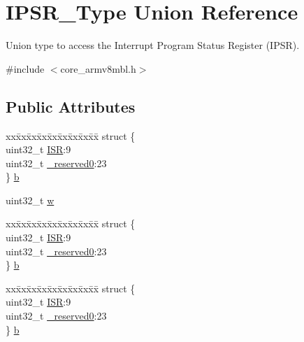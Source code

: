 \hypertarget{union_i_p_s_r___type}{}\section{I\+P\+S\+R\+\_\+\+Type Union Reference}
\label{union_i_p_s_r___type}


Union type to access the Interrupt Program Status Register (I\+P\+SR).  




{\ttfamily \#include $<$core\+\_\+armv8mbl.\+h$>$}

\subsection*{Public Attributes}
\begin{DoxyCompactItemize}
\item 
\begin{tabbing}
xx\=xx\=xx\=xx\=xx\=xx\=xx\=xx\=xx\=\kill
struct \{\\
\>uint32\_t \mbox{\hyperlink{union_i_p_s_r___type_ab46e5f1b2f4d17cfb9aca4fffcbb2fa5}{ISR}}:9\\
\>uint32\_t \mbox{\hyperlink{union_i_p_s_r___type_ad2eb0a06de4f03f58874a727716aa9aa}{\_reserved0}}:23\\
\} \mbox{\hyperlink{union_i_p_s_r___type_add0d6497bd50c25569ea22b48a03ec50}{b}}\\

\end{tabbing}\item 
uint32\+\_\+t \mbox{\hyperlink{union_i_p_s_r___type_a4adca999d3a0bc1ae682d73ea7cfa879}{w}}
\item 
\begin{tabbing}
xx\=xx\=xx\=xx\=xx\=xx\=xx\=xx\=xx\=\kill
struct \{\\
\>uint32\_t \mbox{\hyperlink{union_i_p_s_r___type_ab46e5f1b2f4d17cfb9aca4fffcbb2fa5}{ISR}}:9\\
\>uint32\_t \mbox{\hyperlink{union_i_p_s_r___type_ad2eb0a06de4f03f58874a727716aa9aa}{\_reserved0}}:23\\
\} \mbox{\hyperlink{union_i_p_s_r___type_aa11b32974d63dd51990089397c4f00f6}{b}}\\

\end{tabbing}\item 
\begin{tabbing}
xx\=xx\=xx\=xx\=xx\=xx\=xx\=xx\=xx\=\kill
struct \{\\
\>uint32\_t \mbox{\hyperlink{union_i_p_s_r___type_ab46e5f1b2f4d17cfb9aca4fffcbb2fa5}{ISR}}:9\\
\>uint32\_t \mbox{\hyperlink{union_i_p_s_r___type_ad2eb0a06de4f03f58874a727716aa9aa}{\_reserved0}}:23\\
\} \mbox{\hyperlink{union_i_p_s_r___type_a53babc0905b7d49ccf703851e101b38a}{b}}\\


\end{tabbing}
\end{DoxyCompactItemize}
